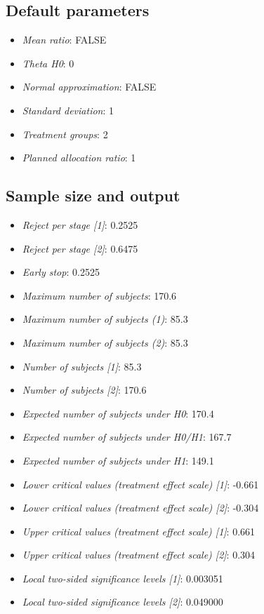 \documentclass[
  letterpaper,
  DIV=11,
  numbers=noendperiod]{scrreprt}
\providecommand{\tightlist}{%
  \setlength{\itemsep}{0pt}\setlength{\parskip}{0pt}}\usepackage{longtable,booktabs,array}
\begin{document}
\hypertarget{default-parameters-3}{%
\subsection{Default parameters}\label{default-parameters-3}}

\begin{itemize}
\tightlist
\item
  \emph{Mean ratio}: FALSE
\item
  \emph{Theta H0}: 0
\item
  \emph{Normal approximation}: FALSE
\item
  \emph{Standard deviation}: 1
\item
  \emph{Treatment groups}: 2
\item
  \emph{Planned allocation ratio}: 1
\end{itemize}

\hypertarget{sample-size-and-output-2}{%
\subsection{Sample size and output}\label{sample-size-and-output-2}}

\begin{itemize}
\tightlist
\item
  \emph{Reject per stage {[}1{]}}: 0.2525
\item
  \emph{Reject per stage {[}2{]}}: 0.6475
\item
  \emph{Early stop}: 0.2525
\item
  \emph{Maximum number of subjects}: 170.6
\item
  \emph{Maximum number of subjects (1)}: 85.3
\item
  \emph{Maximum number of subjects (2)}: 85.3
\item
  \emph{Number of subjects {[}1{]}}: 85.3
\item
  \emph{Number of subjects {[}2{]}}: 170.6
\item
  \emph{Expected number of subjects under H0}: 170.4
\item
  \emph{Expected number of subjects under H0/H1}: 167.7
\item
  \emph{Expected number of subjects under H1}: 149.1
\item
  \emph{Lower critical values (treatment effect scale) {[}1{]}}: -0.661
\item
  \emph{Lower critical values (treatment effect scale) {[}2{]}}: -0.304
\item
  \emph{Upper critical values (treatment effect scale) {[}1{]}}: 0.661
\item
  \emph{Upper critical values (treatment effect scale) {[}2{]}}: 0.304
\item
  \emph{Local two-sided significance levels {[}1{]}}: 0.003051
\item
  \emph{Local two-sided significance levels {[}2{]}}: 0.049000
\end{itemize}
\end{document}
